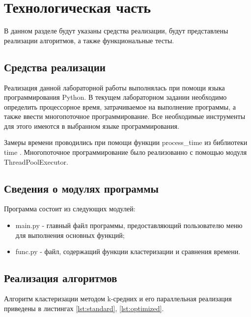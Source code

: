 \chapter{Технологическая часть}

В данном разделе будут указаны средства реализации, будут представлены реализации алгоритмов, а также функциональные тесты.

\section{Средства реализации}

Реализация данной лабораторной работы выполнялась при помощи языка программирования Python.  В текущем лабораторном задании необходимо определить процессорное время, затрачиваемое на выполнение программы, а также ввести многопоточное программирование. Все необходимые инструменты для этого имеются в выбранном
языке программирования\cite{python}.

Замеры времени проводились при помощи функции process\_time из библиотеки time \cite{python-time}.
Многопоточное программирование было реализованно с помощью модуля ThreadPoolExecutor.

\section{Сведения о модулях программы}

Программа состоит из следующих модулей:

\begin{itemize}
	\item main.py - главный файл программы, предоставляющий пользователю меню для выполнения основных функций;
	\item func.py - файл, содержащий функции кластеризации и сравнения времени.
\end{itemize}

\section{Реализация алгоритмов}

Алгоритм кластеризации методом k-средних и его параллельная реализация приведены в листингах \ref{lst:standard}, \ref{lst:optimized}.
\clearpage

